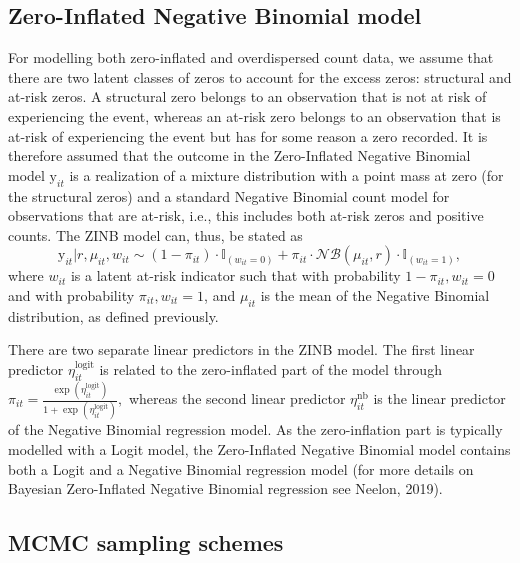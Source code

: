 \documentclass[a4paper, preprint, 3p,
authoryear]{elsarticle} %
\begin{document}
\subsection{Zero-Inflated Negative Binomial
model}\label{zero-inflated-negative-binomial-model}

For modelling both zero-inflated and overdispersed count data, we assume
that there are two latent classes of zeros to account for the excess
zeros: structural and at-risk zeros. A structural zero belongs to an
observation that is not at risk of experiencing the event, whereas an
at-risk zero belongs to an observation that is at-risk of experiencing
the event but has for some reason a zero recorded. It is therefore
assumed that the outcome in the Zero-Inflated Negative Binomial model
\(\text{y}_{it}\) is a realization of a mixture distribution with a
point mass at zero (for the structural zeros) and a standard Negative
Binomial count model for observations that are at-risk, i.e., this
includes both at-risk zeros and positive counts. The ZINB model can,
thus, be stated as \begin{equation*}
 \text{y}_{it}|r,\mu_{it},w_{it} \sim (1-\pi_{it}) \cdot \mathbb{I}_{(w_{it} = 0)} + \pi_{it} \cdot \mathcal{NB}(\mu_{it},r) \cdot \mathbb{I}_{(w_{it}=1)},
\end{equation*} where \({w_{it}}\) is a latent at-risk indicator such
that with probability \({1-\pi_{it}, w_{it} = 0}\) and with probability
\({\pi_{it}, w_{it} = 1}\), and \({\mu_{it}}\) is the mean of the
Negative Binomial distribution, as defined previously.

There are two separate linear predictors in the ZINB model. The first
linear predictor \({\eta_{it}^{\text{logit}}}\) is related to the
zero-inflated part of the model through
\({\pi_{it} = \frac{\exp(\eta_{it}^{\text{logit}})}{1+\exp(\eta_{it}^{\text{logit}})},}\)
whereas the second linear predictor \({\eta_{it}^{\text{nb}}}\) is the
linear predictor of the Negative Binomial regression model. As the
zero-inflation part is typically modelled with a Logit model, the
Zero-Inflated Negative Binomial model contains both a Logit and a
Negative Binomial regression model (for more details on Bayesian
Zero-Inflated Negative Binomial regression see Neelon, 2019).

\subsection{MCMC sampling schemes}\label{mcmc-sampling-schemes}
\end{document}
